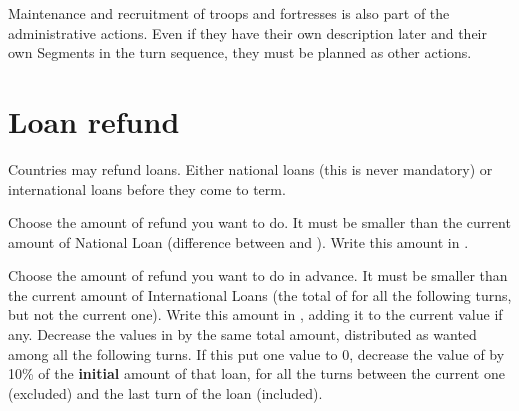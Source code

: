 \aparag Maintenance and recruitment of troops and fortresses is also part of
the administrative actions. Even if they have their own description later and
their own Segments in the turn sequence, they must be planned as other
actions.

\section{Loan refund}\label{chExpenses:Refund}
\aparag Countries may refund loans. Either national loans (this is never
mandatory) or international loans before they come to term.

 Choose the amount of refund you want to do. It must be
smaller than the current amount of National Loan (difference between
 and ).
\bparag Write this amount in .

 Choose the amount of refund you want to do in
advance. It must be smaller than the current amount of International Loans
(the total of  for all the following
turns, but not the current one).
\bparag Write this amount in , adding
it to the current value if any.
\bparag Decrease the values in  by
the same total amount, distributed as wanted among all the following turns.
\bparag If this put one value to 0\ducats, decrease the value of
 by 10\% of the \textbf{initial}
amount of that loan, for all the turns between the current one (excluded) and
the last turn of the loan (included).

